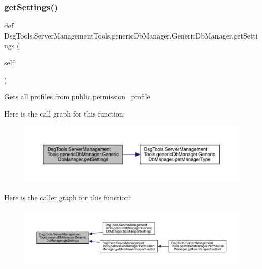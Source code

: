 \subsubsection{\texorpdfstring{get\+Settings()}{getSettings()}}
{\footnotesize\ttfamily def Dsg\+Tools.\+Server\+Management\+Tools.\+generic\+Db\+Manager.\+Generic\+Db\+Manager.\+get\+Settings (\begin{DoxyParamCaption}\item[{}]{self }\end{DoxyParamCaption})}

\begin{DoxyVerb}Gets all profiles from public.permission_profile
\end{DoxyVerb}
 Here is the call graph for this function\+:
\nopagebreak
\begin{figure}[H]
\begin{center}
\leavevmode
\includegraphics[width=350pt]{class_dsg_tools_1_1_server_management_tools_1_1generic_db_manager_1_1_generic_db_manager_a4817d8093103ba3574d693fb172ad89b_cgraph}
\end{center}
\end{figure}
Here is the caller graph for this function\+:
\nopagebreak
\begin{figure}[H]
\begin{center}
\leavevmode
\includegraphics[width=350pt]{class_dsg_tools_1_1_server_management_tools_1_1generic_db_manager_1_1_generic_db_manager_a4817d8093103ba3574d693fb172ad89b_icgraph}
\end{center}
\end{figure}
\mbox{\label{class_dsg_tools_1_1_server_management_tools_1_1generic_db_manager_1_1_generic_db_manager_ada6319f12f97e937d8107a0655eea9a5}} 
